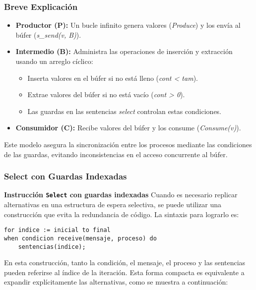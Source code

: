\documentclass[a4paper,12pt]{article}
\begin{document}
    
    

\subsubsection*{Breve Explicación}

\begin{itemize}
    \item \textbf{Productor (P):} Un bucle infinito genera valores (\textit{Produce}) y los envía al búfer (\textit{s\_send(v, B)}).
    \item \textbf{Intermedio (B):} Administra las operaciones de inserción y extracción usando un arreglo cíclico:
    \begin{itemize}
        \item Inserta valores en el búfer si no está lleno (\textit{cont < tam}).
        \item Extrae valores del búfer si no está vacío (\textit{cont > 0}).
        \item Las guardas en las sentencias \textit{select} controlan estas condiciones.
    \end{itemize}
    \item \textbf{Consumidor (C):} Recibe valores del búfer y los consume (\textit{Consume(v)}).
\end{itemize}

Este modelo asegura la sincronización entre los procesos mediante las condiciones de las guardas, evitando inconsistencias en el acceso concurrente al búfer.


\subsubsection{Select con Guardas Indexadas}

\textbf{Instrucción \texttt{Select} con guardas indexadas}  
Cuando es necesario replicar alternativas en una estructura de espera selectiva, se puede utilizar una construcción que evita la redundancia de código. La sintaxis para lograrlo es:

\begin{lstlisting}[style=customcpp]
for indice := inicial to final
when condicion receive(mensaje, proceso) do
    sentencias(indice);
\end{lstlisting}

En esta construcción, tanto la condición, el mensaje, el proceso y las sentencias pueden referirse al índice de la iteración. Esta forma compacta es equivalente a expandir explícitamente las alternativas, como se muestra a continuación:
\end{document}
